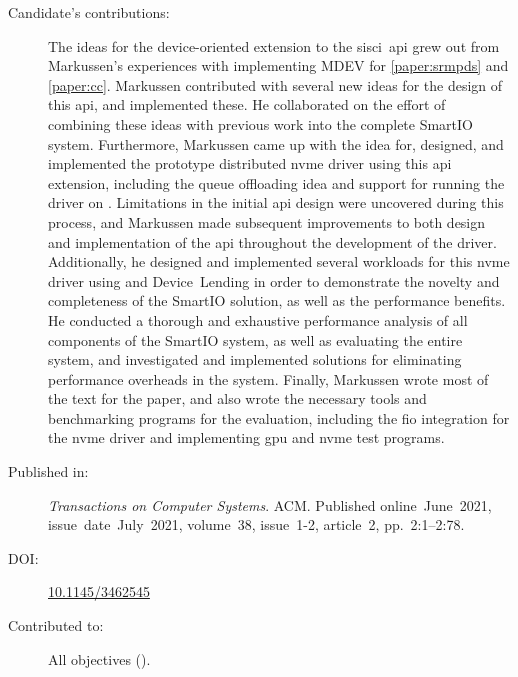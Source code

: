 \begin{description}
	\item[Candidate's contributions:]
		The ideas for the device-oriented extension to the \acrshort{sisci}~\acrshort{api} grew out from Markussen's experiences with implementing MDEV for \cref{paper:srmpds} and \cref{paper:cc}.
		Markussen contributed with several new ideas for the design of this \acrshort{api}, and implemented these.
		He collaborated on the effort of combining these ideas with previous work into the complete SmartIO system. 
		Furthermore, Markussen came up with the idea for, designed, and implemented the prototype distributed \acrshort{nvme} driver using this \acrshort{api} extension, 
		including the queue offloading idea and support for running the driver on .
		Limitations in the initial \acrshort{api} design were uncovered during this process, and Markussen made subsequent improvements to both design and implementation of the \acrshort{api} throughout the development of the driver.
		Additionally, he designed and implemented several workloads for this \acrshort{nvme} driver using  and Device~Lending
		in order to demonstrate the novelty and completeness of the SmartIO solution, as well as the performance benefits.
		He conducted a thorough and exhaustive performance analysis of all components of the SmartIO system,
		as well as evaluating the entire system, and investigated and implemented solutions for eliminating performance overheads in the system.
		Finally, Markussen wrote most of the text for the paper, and also wrote the necessary tools and benchmarking programs for the evaluation,
		including the \acrshort{fio} integration for the \acrshort{nvme} driver and implementing \acrshort{gpu} and \acrshort{nvme} test programs.
		

	\item[Published in:]
		\emph{Transactions on Computer Systems}. ACM.
		Published online~June~2021,
		issue~date~July~2021, 
		volume~38, issue~1-2, article~2, pp.~2:1--2:78.

	\item[DOI:] \href{https://doi.org/10.1145/3462545}{10.1145/3462545}

	\item[Contributed to:]
		All objectives ().

\end{description}


